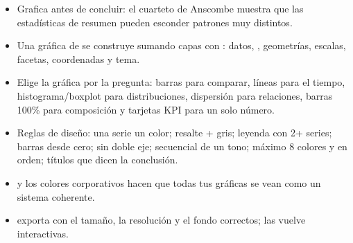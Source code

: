 \begin{resumen}
\begin{itemize}
  \item Grafica antes de concluir: el cuarteto de Anscombe muestra que las
        estadísticas de resumen pueden esconder patrones muy distintos.
  \item Una gráfica de  se construye sumando capas con
        \codigo{+}: datos, , geometrías, escalas, facetas,
        coordenadas y tema.
  \item Elige la gráfica por la pregunta: barras para comparar, líneas para
        el tiempo, histograma/boxplot para distribuciones, dispersión para
        relaciones, barras 100\% para composición y tarjetas KPI para un
        solo número.
  \item Reglas de diseño: una serie un color; resalte + gris; leyenda con
        2+ series; barras desde cero; sin doble eje; secuencial de un tono;
        máximo 8 colores y en orden; títulos que dicen la conclusión.
  \item {} y los colores corporativos hacen que todas
        tus gráficas se vean como un sistema coherente.
  \item {} exporta con el tamaño, la resolución y el fondo
        correctos;  las vuelve interactivas.
\end{itemize}


\end{resumen}
